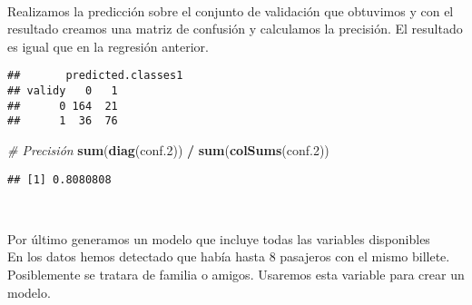 \documentclass[
]{article}
\newenvironment{Shaded}{\begin{snugshade}}{\end{snugshade}}
\newcommand{\CommentTok}[1]{\textcolor[rgb]{0.56,0.35,0.01}{\textit{#1}}}
\newcommand{\DataTypeTok}[1]{\textcolor[rgb]{0.13,0.29,0.53}{#1}}
\newcommand{\DecValTok}[1]{\textcolor[rgb]{0.00,0.00,0.81}{#1}}
\newcommand{\FloatTok}[1]{\textcolor[rgb]{0.00,0.00,0.81}{#1}}
\newcommand{\KeywordTok}[1]{\textcolor[rgb]{0.13,0.29,0.53}{\textbf{#1}}}
\newcommand{\NormalTok}[1]{#1}
\newcommand{\OperatorTok}[1]{\textcolor[rgb]{0.81,0.36,0.00}{\textbf{#1}}}
\newcommand{\StringTok}[1]{\textcolor[rgb]{0.31,0.60,0.02}{#1}}
\begin{document}
\texttt{}\\
\texttt{}

Realizamos la predicción sobre el conjunto de validación que obtuvimos y
con el resultado creamos una matriz de confusión y calculamos la
precisión. El resultado es igual que en la regresión anterior.

\texttt{}

\begin{Shaded}
\end{Shaded}

\begin{verbatim}
##       predicted.classes1
## validy   0   1
##      0 164  21
##      1  36  76
\end{verbatim}

\begin{Shaded}
\begin{Highlighting}[]
\CommentTok{# Precisión}
\KeywordTok{sum}\NormalTok{(}\KeywordTok{diag}\NormalTok{(conf}\FloatTok{.2}\NormalTok{)) }\OperatorTok{/}\StringTok{ }\KeywordTok{sum}\NormalTok{(}\KeywordTok{colSums}\NormalTok{(conf}\FloatTok{.2}\NormalTok{))}
\end{Highlighting}
\end{Shaded}

\begin{verbatim}
## [1] 0.8080808
\end{verbatim}

\texttt{}\\
\texttt{}

Por último generamos un modelo que incluye todas las variables
disponibles \texttt{}\\
En los datos hemos detectado que había hasta 8 pasajeros con el mismo
billete. Posiblemente se tratara de familia o amigos. Usaremos esta
variable para crear un modelo.
\end{document}
